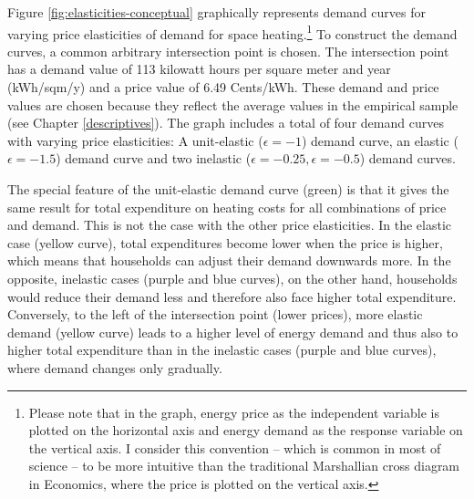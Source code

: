 \documentclass[12pt,twoside]{reedthesis}
\begin{document}
Figure \ref{fig:elasticities-conceptual} graphically represents demand curves for varying price elasticities of demand for space heating.\footnote{Please note that in the graph, energy price as the independent variable is plotted on the horizontal axis and energy demand as the response variable on the vertical axis. I consider this convention -- which is common in most of science -- to be more intuitive than the traditional Marshallian cross diagram in Economics, where the price is plotted on the vertical axis.} To construct the demand curves, a common arbitrary intersection point is chosen. The intersection point has a demand value of 113 kilowatt hours per square meter and year (kWh/sqm/y) and a price value of 6.49 Cents/kWh. These demand and price values are chosen because they reflect the average values in the empirical sample (see Chapter \ref{descriptives}). The graph includes a total of four demand curves with varying price elasticities: A unit-elastic (\(\epsilon = -1\)) demand curve, an elastic (\(\epsilon = -1.5\)) demand curve and two inelastic (\(\epsilon = -0.25, \epsilon = -0.5\)) demand curves.

The special feature of the unit-elastic demand curve (green) is that it gives the same result for total expenditure on heating costs for all combinations of price and demand. This is not the case with the other price elasticities. In the elastic case (yellow curve), total expenditures become lower when the price is higher, which means that households can adjust their demand downwards more. In the opposite, inelastic cases (purple and blue curves), on the other hand, households would reduce their demand less and therefore also face higher total expenditure. Conversely, to the left of the intersection point (lower prices), more elastic demand (yellow curve) leads to a higher level of energy demand and thus also to higher total expenditure than in the inelastic cases (purple and blue curves), where demand changes only gradually.
\end{document}
